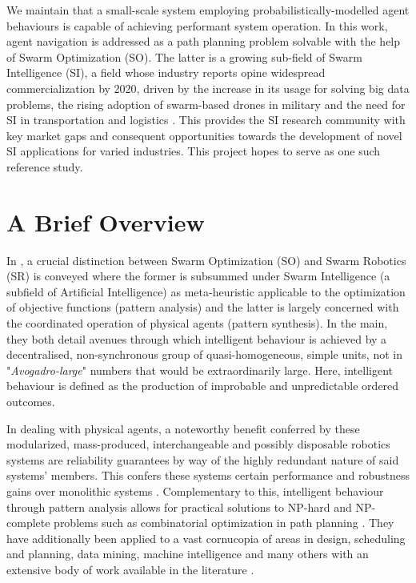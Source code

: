 \documentclass{report}
\begin{document}
We maintain that a small-scale system employing probabilistically-modelled agent behaviours is capable of achieving performant system operation. In this work, agent navigation is addressed as a path planning problem solvable with the help of Swarm Optimization (SO). The latter is a growing sub-field of Swarm Intelligence (SI), a field whose industry reports opine widespread commercialization by 2020, driven by the increase in its usage for solving big data problems, the rising adoption of swarm-based drones in military and the need for SI in transportation and logistics \cite{Swarm2030}. This provides the SI research community with key market gaps and consequent opportunities towards the development of novel SI applications for varied industries. This project hopes to serve as one such reference study.

\section{A Brief Overview}
In \cite{Beni2005a}, a crucial distinction between Swarm Optimization (SO) and Swarm Robotics (SR) is conveyed where the former is subsummed under Swarm Intelligence (a subfield of Artificial Intelligence) as meta-heuristic applicable to the optimization of objective functions (pattern analysis) and the latter is largely concerned with the coordinated operation of physical agents (pattern synthesis). In the main, they both detail avenues through which intelligent behaviour is achieved by a decentralised, non-synchronous group of quasi-homogeneous, simple units, not in "\textit{Avogadro-large}" numbers that would be extraordinarily large. Here, intelligent behaviour is defined as the production of improbable and unpredictable ordered outcomes.

In dealing with physical agents, a noteworthy benefit conferred by these modularized, mass-produced, interchangeable and possibly disposable robotics systems are reliability guarantees by way of the highly redundant nature of said systems' members. This confers these systems certain performance and robustness gains over monolithic systems \cite{Iocchi2001}. Complementary to this, intelligent behaviour through pattern analysis allows for practical solutions to NP-hard and NP-complete problems such as combinatorial optimization in path planning \cite{Yan2012}. They have additionally been applied to a vast cornucopia of areas in design, scheduling and planning, data mining, machine intelligence and many others with an extensive body of work available in the literature \cite{Yang2011}.
\end{document}
